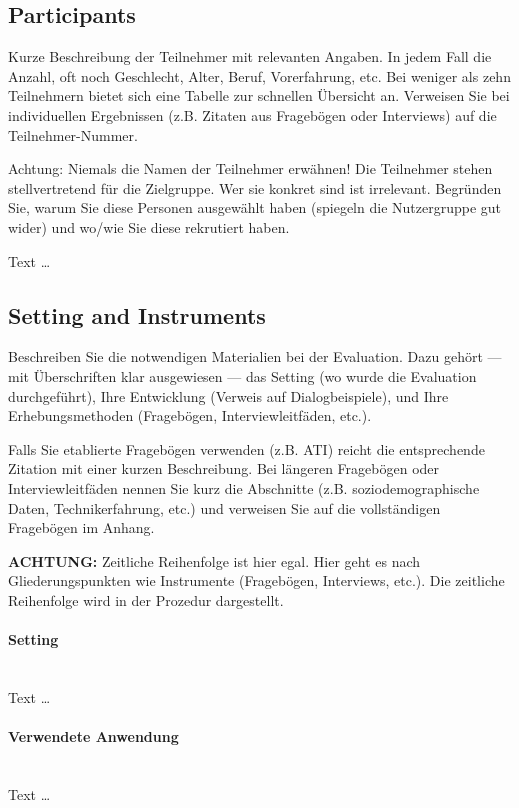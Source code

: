 \documentclass[11pt,a4paper,english]{scrreprt}
\newenvironment{comment}
  {\par\medskip
   \begingroup\color{olive}%
   }
 {\endgroup
  \medskip}
\begin{document}
\subsection{Participants}
\begin{comment}
Kurze Beschreibung der Teilnehmer mit relevanten Angaben. In jedem Fall die Anzahl, oft noch Geschlecht, Alter, Beruf, Vorerfahrung, etc. Bei weniger als zehn Teilnehmern bietet sich eine Tabelle zur schnellen Übersicht an. Verweisen Sie bei individuellen Ergebnissen (z.B. Zitaten aus Fragebögen oder Interviews) auf die Teilnehmer-Nummer.

Achtung: Niemals die Namen der Teilnehmer erwähnen! Die Teilnehmer stehen stellvertretend für die Zielgruppe. Wer sie konkret sind ist irrelevant. Begründen Sie, warum Sie diese Personen ausgewählt haben (spiegeln die Nutzergruppe gut wider) und wo/wie Sie diese rekrutiert haben.
\end{comment}

Text \dots

\subsection{Setting and Instruments}
\begin{comment}
Beschreiben Sie die notwendigen Materialien bei der Evaluation. Dazu gehört — mit Überschriften klar ausgewiesen — das Setting (wo wurde die Evaluation durchgeführt), Ihre Entwicklung (Verweis auf Dialogbeispiele), und Ihre Erhebungsmethoden (Fragebögen, Interviewleitfäden, etc.).

Falls Sie etablierte Fragebögen verwenden (z.B. ATI) reicht die entsprechende Zitation mit einer kurzen Beschreibung. Bei längeren Fragebögen oder Interviewleitfäden nennen Sie kurz die Abschnitte (z.B. soziodemographische Daten, Technikerfahrung, etc.) und verweisen Sie auf die vollständigen Fragebögen im Anhang.

\textbf{ACHTUNG:} Zeitliche Reihenfolge ist hier egal. Hier geht es nach Gliederungspunkten wie Instrumente (Fragebögen, Interviews, etc.). Die zeitliche Reihenfolge wird in der Prozedur dargestellt.
\end{comment}

\paragraph{Setting}\mbox{} \\
Text \dots

\paragraph{Verwendete Anwendung}\mbox{} \\
Text \dots
\end{document}
